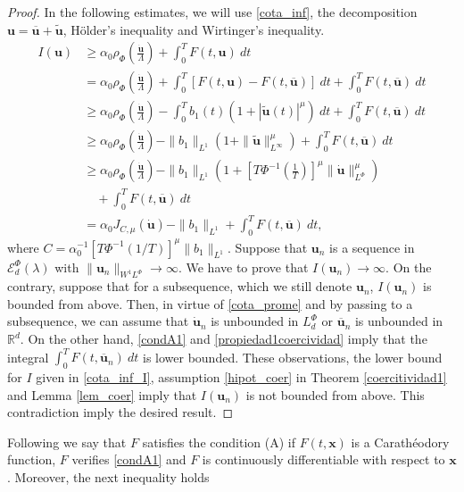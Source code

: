 \documentclass[twoside]{article}
\theoremstyle{remark}
\newcommand{\orlnor}{\|_{L^{\Phi}}}
\newcommand{\lphi}{L^{\Phi}}
\newcommand{\sobnor}{\|_{W^{1}\lphi}}
\newcommand{\domi}{\mathcal{E}^{\Phi}_d(\lambda)}
\renewcommand{\b}[1]{\boldsymbol{#1}}
\begin{document}
\begin{proof} In the following estimates, we will use \eqref{cota_inf}, the decomposition $\b{u}=\b{\overline{u}}+\b{\tilde{u}}$, H\"older's inequality and Wirtinger's inequality. 
\begin{equation}\label{cota_inf_I}
\begin{split}
I(\b{u})&\geq\alpha_0\rho_{\Phi}\left( \frac{\b{\dot{u}}}{\Lambda}\right)+\int_0^TF(t,\b{u})\ dt\\ 
&=\alpha_0\rho_{\Phi}\left( \frac{\b{\dot{u}}}{\Lambda}\right)+ \int_0^T \left[F(t,\b{u})-F(t,\b{\overline{u}})\right]\ dt +  \int_0^TF(t,\b{\overline{u}})\ dt\\
&\geq\alpha_0\rho_{\Phi}\left( \frac{\b{\dot{u}}}{\Lambda}\right)- \int_0^Tb_1(t)(1+|\b{\tilde{u}}(t)|^{\mu})\ dt +  \int_0^TF(t,\b{\overline{u}})\ dt\\
&\geq \alpha_0\rho_{\Phi}\left( \frac{\b{\dot{u}}}{\Lambda}\right)- \|b_1\|_{L^1}(1+\|\b{\tilde{u}}\|_{L^{\infty}}^{\mu}) +  \int_0^TF(t,\b{\overline{u}})\ dt\\
&\geq\alpha_0\rho_{\Phi}\left( \frac{\b{\dot{u}}}{\Lambda}\right)- \|b_1\|_{L^1}\left(1+\left[T\Phi^{-1}\left(\frac{1}{T}\right)\right]^{\mu}\|\b{\dot u}\orlnor^{\mu}\right) \\
&\quad+  \int_0^TF(t,\b{\overline{u}})\ dt\\
&=\alpha_0J_{C,\mu}(\b{\dot{u}})- \|b_1\|_{L^1}+ \int_0^TF(t,\b{\overline{u}})\ dt,
\end{split}
\end{equation}
where $C=\alpha_0^{-1}\left[T\Phi^{-1}\left(1/T\right)\right]^{\mu}\|b_1\|_{L^1}$.
Suppose that $\b{u}_n$ is a sequence in $\domi$ with  
$\|\b{u}_n\sobnor\to\infty$. We have to prove that $I(\b{u}_n)\to\infty$. On the contrary, suppose  that for a subsequence, which we
still denote $\b{u}_n$, $I(\b{u}_n)$ is bounded from above. Then, in virtue of \eqref{cota_prome} and by passing to a subsequence, we can assume that $\b{\dot{u}}_n$ is unbounded in $\lphi_d$ or $\b{\overline{u}}_n$ is unbounded in $\mathbb{R}^d$.
On the other hand,  \eqref{condA1} and \eqref{propiedad1coercividad}
imply that the integral $\int_0^TF(t,\b{\overline{u}}_n)\ dt$ is lower bounded. 
These observations, the lower bound for $I$ given in \eqref{cota_inf_I}, 
assumption \ref{hipot_coer} in Theorem \ref{coercitividad1} and Lemma \ref{lem_coer} imply that $I(\b{u}_n)$ is not bounded from above. This contradiction imply the desired result.
\end{proof}


Following \cite{mawhin2010critical} we say that $F$ satisfies the condition (A) if  $F(t,\b{x})$ is a Carath\'eodory function, $F$ verifies \eqref{condA1} and $F$ is continuously differentiable with respect to $\b{x}$. Moreover, the next inequality holds 
\end{document}
